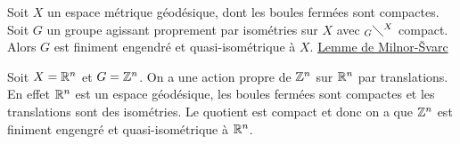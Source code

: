   \begin{theo} \label{thm:milnor-svarc} 
    Soit $X$ un espace métrique géodésique, dont les boules fermées sont compactes. Soit $G$ un groupe
    agissant proprement par isométries sur $X$ avec $_G\diagdown^X$ compact. Alors $G$ est finiment engendré
    et quasi-isométrique à $X$. \href{https://392c.wordpress.com/2009/02/09/thesvarc-milnor-lemma/}{Lemme de Milnor-\v{S}varc}
  \end{theo}


  \begin{ex}
    Soit $X = \mathbb{R}^n$ et $G = \mathbb{Z}^n$. On a une action propre de $\mathbb{Z}^n$ sur $\mathbb{R}^n$ par translations. En effet
    $\mathbb{R}^n$ est un espace géodésique, les boules fermées sont compactes et les translations sont des
    isométries. Le quotient est compact et donc on a que $\mathbb{Z}^n$ est finiment engengré et quasi-isométrique à
    $\mathbb{R}^n$. 
  \end{ex}

